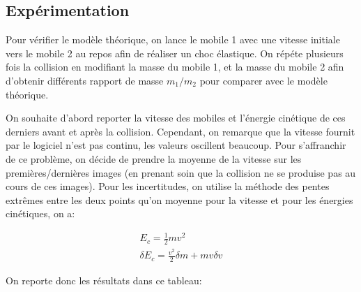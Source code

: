 \documentclass[12pt]{article}
\begin{document}
\subsection{Expérimentation}
Pour vérifier le modèle théorique, on lance le mobile 1 avec une vitesse initiale vers le mobile 2 au repos afin de réaliser un choc élastique.
On répéte plusieurs fois la collision en modifiant la masse du mobile 1, et la masse du mobile 2 afin d'obtenir différents rapport de masse $m_1/m_2$ pour comparer avec
le modèle théorique.

On souhaite d'abord reporter la vitesse des mobiles et l'énergie cinétique de ces derniers avant et après la collision. Cependant, on remarque que la vitesse 
fournit par le logiciel n'est pas continu, les valeurs oscillent beaucoup. Pour s'affranchir de ce problème, on décide de prendre la moyenne de la vitesse sur les premières/dernières images
(en prenant soin que la collision ne se produise pas au cours de ces images). Pour les incertitudes, on utilise la méthode des pentes extrêmes entre les deux points qu'on moyenne pour la vitesse et pour les énergies cinétiques, on a:

\begin{gather}
    E_c = \frac{1}{2} m v^2 \\
    \delta E_c = \frac{v^2}{2} \delta m + mv \delta v
\end{gather}

On reporte donc les résultats dans ce tableau:
\end{document}
